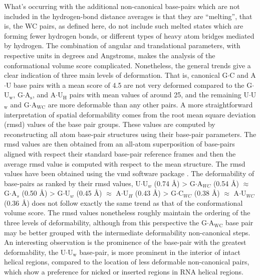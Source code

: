 What's  occurring with the  additional non-canonical  base-pairs which
are not included  in the hydrogen-bond distance averages  is that they
are  ``melting'', that  is,  the WC  pairs,  as defined  here, do  not
include such melted states which  are forming fewer hydrogen bonds, or
different  types of  heavy  atom bridges  mediated  by hydrogen.   The
combination of  angular and translational  parameters, with respective
units   in  degrees  and   Angstroms,  makes   the  analysis   of  the
conformational  volume score  complicated.   Nonetheless, the  general
trends give  a clear indication  of three main levels  of deformation.
That  is, canonical  G$\cdot$C and  A$\cdot$U base  pairs with  a mean
score   of    4.5   are   not   very   deformed    compared   to   the
G$\cdot$U$_{\text{w}}$,           G$\cdot$A$_{\text{s}}$,          and
A$\cdot$U$_{\text{H}}$ pairs  with mean values  of around 25,  and the
remaining U$\cdot$U$_{\text{w}}$  and G$\cdot$A$_{\text{WC}}$ are more
deformable   than   any   other   pairs.    A   more   straightforward
interpretation  of  spatial deformability  comes  from  the root  mean
square deviation (rmsd)  values of the base pair  groups. These values
are  computed by  reconstructing all  atom base-pair  structures using
their base-pair parameters.  The rmsd values are then obtained from an
all-atom  superposition  of  base-pairs  aligned  with  respect  their
standard base-pair reference frames and then the average rmsd value is
computed with respect to the mean structure. The rmsd values have been
obtained  using  the  vmd  software  package  \cite{eargle2006}.   The
deformability  of   base-pairs  as   ranked  by  their   rmsd  values,
U$\cdot$U$_{w}$  (0.74 \AA)  > G$\cdot$A$_{WC}$  (0.54  \AA) $\approx$
G$\cdot$A$_{s}$  (0.50  \AA) >  G$\cdot$U$_{w}$  (0.45 \AA)  $\approx$
A$\cdot$U$_{H}$  (0.43 \AA)  > G$\cdot$C$_{WC}$  (0.38  \AA) $\approx$
A$\cdot$U$_{WC}$ (0.36 \AA) does not  follow exactly the same trend as
that of the conformational  volume score.  The rmsd values nonetheless
roughly maintain  the ordering of  the three levels  of deformability,
although from  this perspective the  G$\cdot$A$_{\text{WC}}$ base pair
may   be   better   grouped   with  the   intermediate   deformability
non-canonical steps.  An interesting  observation is the prominence of
the    base-pair     with    the    greatest     deformability,    the
U$\cdot$U$_{\text{w}}$ base-pair, is more prominent in the interior of
intact helical  regions, compared to  the location of  less deformable
non-canonical pairs,  which show a  preference for nicked  or inserted
regions in RNA helical regions.

